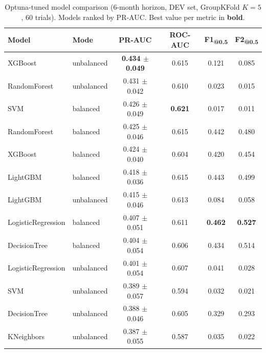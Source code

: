 \begin{table}[ht]
\centering
\caption{Optuna-tuned model comparison (6-month horizon, DEV set, GroupKFold $K\!=\!5$, 60 trials). Models ranked by PR-AUC. Best value per metric in \textbf{bold}.}
\label{tab:step5v2_tuning}
\small
\begin{tabular}{llcccc}
\toprule
Model & Mode & PR-AUC & ROC-AUC & F1\textsubscript{@0.5} & F2\textsubscript{@0.5} \\
\midrule
XGBoost & unbalanced & \textbf{0.434 $\pm$ 0.049} & 0.615 & 0.121 & 0.085 \\
RandomForest & unbalanced & 0.431 $\pm$ 0.042 & 0.610 & 0.023 & 0.015 \\
SVM & balanced & 0.426 $\pm$ 0.049 & \textbf{0.621} & 0.017 & 0.011 \\
RandomForest & balanced & 0.425 $\pm$ 0.046 & 0.615 & 0.442 & 0.480 \\
XGBoost & balanced & 0.424 $\pm$ 0.040 & 0.604 & 0.420 & 0.454 \\
LightGBM & balanced & 0.418 $\pm$ 0.036 & 0.615 & 0.443 & 0.499 \\
LightGBM & unbalanced & 0.415 $\pm$ 0.046 & 0.613 & 0.084 & 0.058 \\
LogisticRegression & balanced & 0.407 $\pm$ 0.051 & 0.611 & \textbf{0.462} & \textbf{0.527} \\
DecisionTree & balanced & 0.404 $\pm$ 0.054 & 0.606 & 0.434 & 0.514 \\
LogisticRegression & unbalanced & 0.401 $\pm$ 0.054 & 0.607 & 0.041 & 0.028 \\
SVM & unbalanced & 0.389 $\pm$ 0.057 & 0.594 & 0.032 & 0.021 \\
DecisionTree & unbalanced & 0.388 $\pm$ 0.046 & 0.605 & 0.329 & 0.293 \\
KNeighbors & unbalanced & 0.387 $\pm$ 0.055 & 0.587 & 0.035 & 0.022 \\
\bottomrule
\end{tabular}
\end{table}
